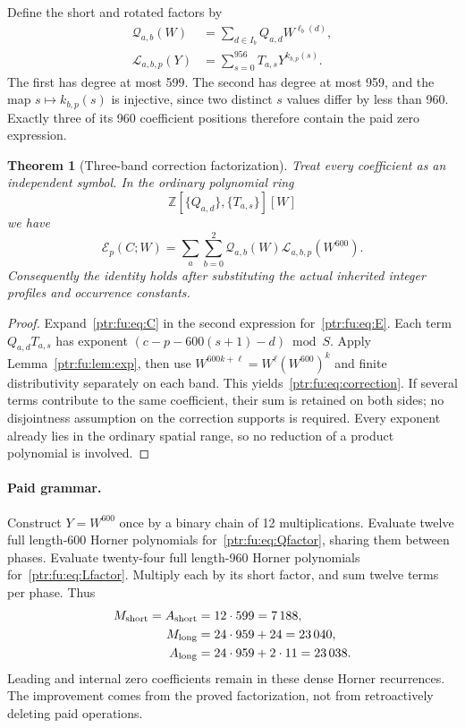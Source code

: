 \documentclass[11pt,letterpaper]{article}
\newtheorem{theorem}{Theorem}[section]
\theoremstyle{definition}\newtheorem{definition}[theorem]{Definition}
\theoremstyle{remark}\newtheorem{remark}[theorem]{Remark}
\newcommand{\Z}{\mathbb Z}\newcommand{\N}{\mathbb N}\newcommand{\Zp}{\mathbb Z_{>0}}
\newcommand{\E}{\mathcal E}\newcommand{\calQ}{\mathcal Q}\newcommand{\calL}{\mathcal L}
\begin{document}
Define the short and rotated factors by
\begin{align}
 \calQ_{a,b}(W)&=\sum_{d\in I_b}Q_{a,d}W^{\ell_b(d)},\label{ptr:fu:eq:Qfactor}\\
 \calL_{a,b,p}(Y)&=\sum_{s=0}^{956}T_{a,s}Y^{k_{b,p}(s)}.\label{ptr:fu:eq:Lfactor}
\end{align}
The first has degree at most 599. The second has degree at most 959, and the map $s\mapsto k_{b,p}(s)$ is injective, since two distinct $s$ values differ by less than 960. Exactly three of its 960 coefficient positions therefore contain the paid zero expression.

\begin{theorem}[Three-band correction factorization]\label{ptr:fu:thm:corr}
Treat every coefficient as an independent symbol. In the ordinary polynomial ring
\[\Z[\{Q_{a,d}\},\{T_{a,s}\}][W]\]
we have
\begin{equation}\label{ptr:fu:eq:correction}
 \E_p(C;W)=\sum_a\sum_{b=0}^2
       \calQ_{a,b}(W)\calL_{a,b,p}(W^{600}).
\end{equation}
Consequently the identity holds after substituting the actual inherited integer profiles and occurrence constants.
\end{theorem}
\begin{proof}
Expand~\eqref{ptr:fu:eq:C} in the second expression for~\eqref{ptr:fu:eq:E}. Each term $Q_{a,d}T_{a,s}$ has exponent
$(c-p-600(s+1)-d)\bmod S$. Apply Lemma~\ref{ptr:fu:lem:exp}, then use
$W^{600k+\ell}=W^\ell(W^{600})^k$ and finite distributivity separately on each band. This yields~\eqref{ptr:fu:eq:correction}. If several terms contribute to the same coefficient, their sum is retained on both sides; no disjointness assumption on the correction supports is required. Every exponent already lies in the ordinary spatial range, so no reduction of a product polynomial is involved.
\end{proof}

\paragraph{Paid grammar.}
Construct $Y=W^{600}$ once by a binary chain of 12 multiplications. Evaluate twelve full length-600 Horner polynomials for~\eqref{ptr:fu:eq:Qfactor}, sharing them between phases. Evaluate twenty-four full length-960 Horner polynomials for~\eqref{ptr:fu:eq:Lfactor}. Multiply each by its short factor, and sum twelve terms per phase. Thus
\begin{align*}
 M_{\rm short}=A_{\rm short}&=12\cdot599=7\,188,\\
 M_{\rm long}&=24\cdot959+24=23\,040,\\
 A_{\rm long}&=24\cdot959+2\cdot11=23\,038.
\end{align*}
Leading and internal zero coefficients remain in these dense Horner recurrences. The improvement comes from the proved factorization, not from retroactively deleting paid operations.
\end{document}
